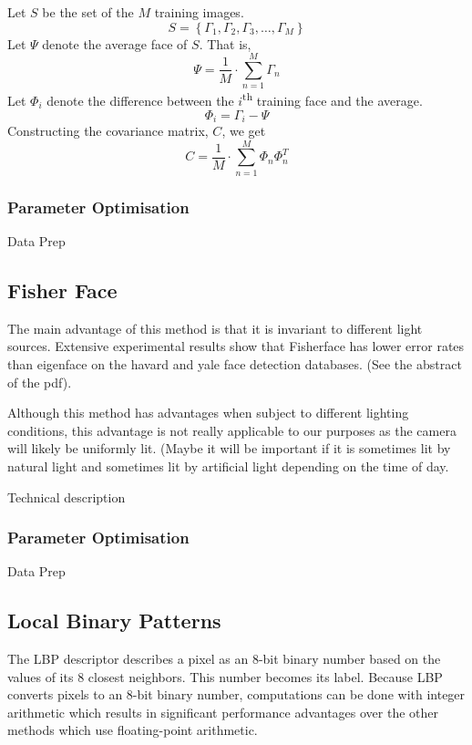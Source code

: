\documentclass{article}
\begin{document}
\vspace{12pt} \noindent Let $S$ be the set of the $M$ training images.
\begin{equation}
	S = \left\{\Gamma_1, \Gamma_2, \Gamma_3, \ldots, \Gamma_M\right\}
\end{equation}
Let $\Psi$ denote the average face of $S$. That is,
\begin{equation}
	\Psi = \frac{1}{M}\cdot\sum_{n=1}^{M}\Gamma_n
\end{equation}
Let $\Phi_i$ denote the difference between the $i$\textsuperscript{th} training face and the average.
\begin{equation}
	\Phi_i = \Gamma_i - \Psi
\end{equation}
Constructing the covariance matrix, $C$, we get
\begin{equation}
	C = \frac{1}{M}\cdot\sum_{n=1}^{M}\Phi_n \Phi_n^T
\end{equation}

\subsubsection{Parameter Optimisation}
Data Prep

\subsection{Fisher Face}
The main advantage of this method is that it is invariant to different light sources. Extensive experimental results show that Fisherface has lower error rates than eigenface on the havard and yale face detection databases. (See the abstract of the pdf).

Although this method has advantages when subject to different lighting conditions, this advantage is not really applicable to our purposes as the camera will likely be uniformly lit. (Maybe it will be important if it is sometimes lit by natural light and sometimes lit by artificial light depending on the time of day.


Technical description
\subsubsection{Parameter Optimisation}
Data Prep

\subsection{Local Binary Patterns}
The LBP descriptor describes a pixel as an 8-bit binary number based on the values of its 8 closest neighbors. This number becomes its label.
Because LBP converts pixels to an 8-bit binary number, computations can be done with integer arithmetic which results in significant performance advantages over the other methods which use floating-point arithmetic.
\end{document}
